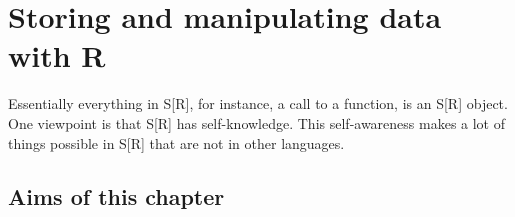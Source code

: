 \documentclass[krantz2,ChapterTOCs]{krantz}\usepackage{knitr}
\begin{document}
\frontmatter

\maketitle


\setcounter{page}{7} %
\tableofcontents
%

\listoffigures
\listoftables
%
%

\mainmatter















\chapter{Storing and manipulating data with R}\label{chap:R:data}

\begin{VF}
Essentially everything in S[R], for instance, a call to a function, is an S[R] object. One viewpoint is that S[R] has self-knowledge. This self-awareness makes a lot of things possible in S[R] that are not in other languages.

\end{VF}


\section{Aims of this chapter}
\end{document}
